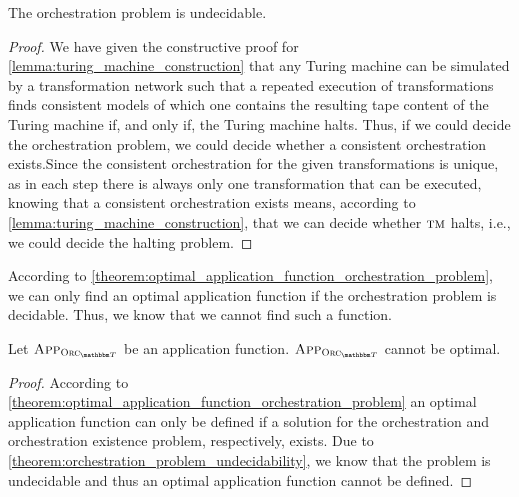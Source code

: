 \begin{theorem} \label{theorem:orchestration_problem_undecidability}
    The orchestration problem is undecidable.
\end{theorem}
\begin{proof}
    We have given the constructive proof for \autoref{lemma:turing_machine_construction} that any Turing machine can be simulated by a transformation network such that a repeated execution of transformations finds consistent models of which one contains the resulting tape content of the Turing machine if, and only if, the Turing machine halts.
    Thus, if we could decide the orchestration problem, we could decide whether a consistent orchestration exists.Since the consistent orchestration for the given transformations is unique, as in each step there is always only one transformation that can be executed, knowing that a consistent orchestration exists means, according to \autoref{lemma:turing_machine_construction}, that we can decide whether $\textsc{tm}$ halts, i.e., we could decide the halting problem.
\end{proof}

According to \autoref{theorem:optimal_application_function_orchestration_problem}, we can only find an optimal application function if the orchestration problem is decidable.
Thus, we know that we cannot find such a function.

\begin{corollary}
    \label{corollary:nooptimalapplication}
    Let $\appfunction{\orcfunction{\transformationset{T}}}$ be an application function. $\appfunction{\orcfunction{\transformationset{T}}}$ cannot be optimal.
\end{corollary}
\begin{proof}
    According to \autoref{theorem:optimal_application_function_orchestration_problem} an optimal application function can only be defined if a solution for the orchestration and orchestration existence problem, respectively, exists.
    Due to \autoref{theorem:orchestration_problem_undecidability}, we know that the problem is undecidable and thus an optimal application function cannot be defined.
\end{proof}

